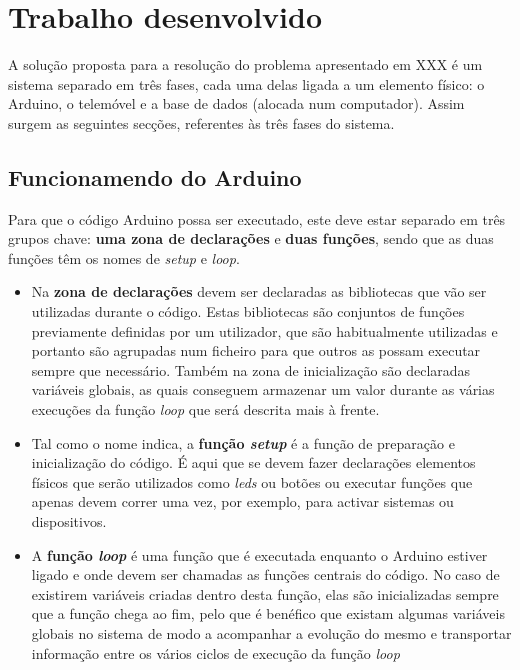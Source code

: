 \chapter{Trabalho desenvolvido}
\label{cha:trabalho desenvolvido}

A solução proposta para a resolução do problema apresentado em XXX é um sistema separado em três fases, cada uma delas ligada a um elemento físico: o Arduino, o telemóvel e a base de dados (alocada num computador). Assim surgem as seguintes secções, referentes às três fases do sistema.

\section{Funcionamendo do Arduino}
\label{sec:funcionamento_do_arduino}

Para que o código Arduino possa ser executado, este deve estar separado em três grupos chave: \textbf{uma zona de declarações} e \textbf{duas funções}, sendo que as duas funções têm os nomes de \emph{setup} e \emph{loop}.
\begin{itemize}
\item Na \textbf{zona de declarações} devem ser declaradas as bibliotecas que vão ser utilizadas durante o código. Estas bibliotecas são conjuntos de funções previamente definidas por um utilizador, que são habitualmente  utilizadas e portanto são agrupadas num ficheiro para que outros as possam executar sempre que necessário. Também na zona de inicialização são declaradas variáveis globais, as quais conseguem armazenar um valor durante as várias execuções da função \emph{loop} que será descrita mais à frente.

\item Tal como o nome indica, a \textbf{função \emph{setup}} é a função de preparação e inicialização do código. É aqui que se devem fazer declarações elementos físicos que serão utilizados como \emph{leds} ou botões ou executar funções que apenas devem correr uma vez, por exemplo, para activar sistemas ou dispositivos.

\item A \textbf{função \emph{loop}} é uma função que é executada enquanto o Arduino estiver ligado e onde devem ser chamadas as funções centrais do código. No caso de existirem variáveis criadas dentro desta função, elas são inicializadas sempre que a função chega ao fim, pelo que é benéfico que existam algumas variáveis globais no sistema de modo a acompanhar a evolução do mesmo e transportar informação entre os vários ciclos de execução da função \emph{loop}
\end{itemize}


